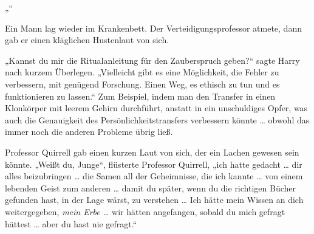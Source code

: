 „“

Ein Mann lag wieder im Krankenbett. Der Verteidigungsprofessor atmete, dann gab er einen kläglichen Hustenlaut von sich.

„Kannst du mir die Ritualanleitung für den Zauberspruch geben?“ sagte Harry nach kurzem Überlegen.
„Vielleicht gibt es eine Möglichkeit, die Fehler zu verbessern, mit genügend Forschung. Einen Weg, es ethisch zu tun und es funktionieren zu lassen.“
Zum Beispiel, indem man den Transfer in einen Klonkörper mit leerem Gehirn durchführt, anstatt in ein unschuldiges Opfer, was auch die Genauigkeit des Persönlichkeitstransfers verbessern könnte … obwohl das immer noch die anderen Probleme übrig ließ.

Professor Quirrell gab einen kurzen Laut von sich, der ein Lachen gewesen sein könnte.
„Weißt du, Junge“, flüsterte Professor Quirrell, „ich hatte gedacht … dir alles beizubringen … die Samen all der Geheimnisse, die ich kannte … von einem lebenden Geist zum anderen … damit du später, wenn du die richtigen Bücher gefunden hast, in der Lage wärst, zu verstehen … Ich hätte mein Wissen an dich weitergegeben, \emph{mein Erbe …} wir hätten angefangen, sobald du mich gefragt hättest … aber du hast nie gefragt.“

